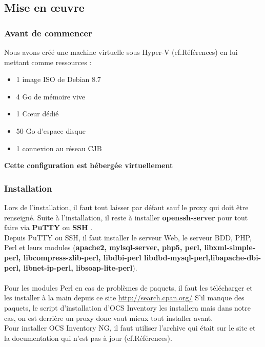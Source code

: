 \documentclass[11pt,a4paper,oneside]{article}
\begin{document}
\subsection{Mise en \oe{}uvre}
\subsubsection{Avant de commencer} 
Nous avons créé une machine virtuelle sous Hyper-V (cf.Références) en lui mettant comme ressources :\\ \begin{itemize}
				\item 1 image ISO de Debian 8.7
				\item 4 Go de mémoire vive
				\item 1 C{\oe}ur dédié
				\item 50 Go d'espace disque
				\item 1 connexion au réseau CJB	
\end{itemize} 

\begin{center}
\textbf{Cette configuration est hébergée virtuellement}
\end{center}
\subsubsection{Installation}
Lors de l'installation, il faut tout laisser par défaut sauf le proxy qui doit être renseigné. Suite à l'installation, il reste à installer \textbf{openssh-server} pour tout faire via \textbf{PuTTY} ou \textbf{SSH} .\\

Depuis PuTTY ou SSH, il faut installer le serveur Web, le serveur BDD, PHP, Perl et leurs modules (\textbf{apache2, mylsql-server, php5, perl, libxml-simple-perl, libcompress-zlib-perl, libdbi-perl libdbd-mysql-perl,libapache-dbi-perl, libnet-ip-perl, libsoap-lite-perl}).\\ \\
Pour les modules Perl en cas de problèmes de paquets, il faut les télécharger et les installer à la main depuis ce site \url{http://search.cpan.org/} 
S'il manque des paquets, le script d'installation d'OCS Inventory les installera mais dans notre cas, on est derrière un proxy donc vaut mieux tout installer avant. \\

Pour installer OCS Inventory NG, il faut utiliser l'archive qui était sur le site et la documentation qui n'est pas à jour (cf.Références).
\newpage
\end{document}
